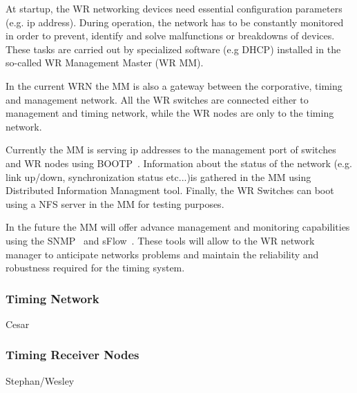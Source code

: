 At startup, the WR networking devices need essential configuration parameters (e.g. ip
address). During operation, the network has to be constantly monitored in
order to prevent, identify and solve malfunctions or breakdowns of devices. 
These tasks are carried out by specialized software (e.g DHCP) installed in the
so-called WR Management Master (WR MM). 

In the current WRN the MM is also a gateway between the corporative, timing and management 
network. All the WR switches are connected either to management and timing
network, while the WR nodes are only to the timing network. 

Currently the MM is serving ip addresses to the management port of switches and WR
nodes using BOOTP~\cite{bootp}. Information about the status of the network (e.g.
link up/down, synchronization status etc...)is gathered in the MM using Distributed Information Managment
tool. Finally, the WR Switches can boot using a NFS server in the MM for testing
purposes. 

In the future the MM will offer advance management and monitoring capabilities
using the SNMP~\cite{snmp} and sFlow~\cite{sflow}. These tools will allow to the 
WR network manager to anticipate networks problems and maintain the reliability
and robustness required for the timing system.


\subsubsection{Timing Network}

Cesar

\subsubsection{Timing Receiver Nodes}

Stephan/Wesley

